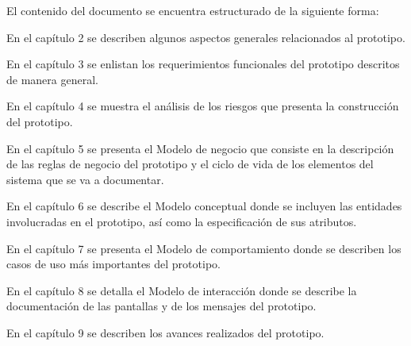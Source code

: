 El contenido del documento se encuentra estructurado de la siguiente forma:

\begin{Citemize}
	\item En el capítulo 2 se describen algunos aspectos generales relacionados al prototipo.
	\item En el capítulo 3 se enlistan los requerimientos funcionales del prototipo descritos de manera general.
	\item En el capítulo 4 se muestra el análisis de los riesgos que presenta la construcción del prototipo.
	\item En el capítulo 5 se presenta el Modelo de negocio que consiste en la descripción de las reglas de negocio del prototipo y el ciclo de vida de los elementos del sistema que se va a documentar.
	\item En el capítulo 6 se describe el Modelo conceptual donde se incluyen las entidades involucradas en el prototipo, así como la especificación de sus atributos.
	\item En el capítulo 7 se presenta el Modelo de comportamiento donde se describen los casos de uso más importantes del prototipo.
	\item En el capítulo 8 se detalla el Modelo de interacción donde se describe la documentación de las pantallas y de los mensajes del prototipo.
	\item En el capítulo 9 se describen los avances realizados del prototipo.
	
\end{Citemize}


